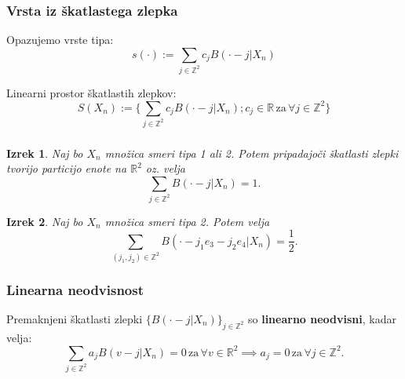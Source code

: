 \documentclass{beamer}
\def\Z{\mathbb{Z}} %
\def\R{\mathbb{R}} %
\newtheorem{izrek}{Izrek}
\begin{document}
\begin{frame}

\frametitle{Vrsta iz škatlastega zlepka}

Opazujemo vrste tipa: $$s(\cdot) := \sum_{j\in\Z^2} c_j B(\cdot - j | X_n) $$

Linearni prostor škatlastih zlepkov: $$S(X_n) := \{ \sum_{j\in\Z^2} c_j B(\cdot - j | X_n) ; c_j \in \R\, \text{za}\, \forall j\in\Z^2 \}$$


\end{frame}


\begin{frame}

\frametitle{}

\begin{izrek}
	Naj bo $X_n$ množica smeri tipa 1 ali 2. Potem pripadajoči škatlasti zlepki tvorijo particijo enote na $\R^2$ oz. velja $$ \sum_{j\in\Z^2} B(\cdot - j | X_n) = 1. $$
\end{izrek}

\vspace{3mm}
\pause

\begin{izrek}
	Naj bo $X_n$ množica smeri tipa 2. Potem velja $$ \sum_{(j_1,j_2)\in\Z^2} B(\cdot - j_1 e_3 - j_2 e_4 | X_n) = \frac{1}{2}. $$
\end{izrek}


\end{frame}


\begin{frame}

\frametitle{Linearna neodvisnost}

Premaknjeni škatlasti zlepki $\{B(\cdot - j | X_n)\}_{j\in\Z^2}$ so \textbf{linearno neodvisni}, kadar velja: $$\sum_{j\in\Z^2} a_j B(v - j | X_n) = 0 \, \text{za} \, \forall v\in\R^2 \implies a_j = 0 \, \text{za} \, \forall j\in\Z^2.$$

\end{frame}

\end{document}
